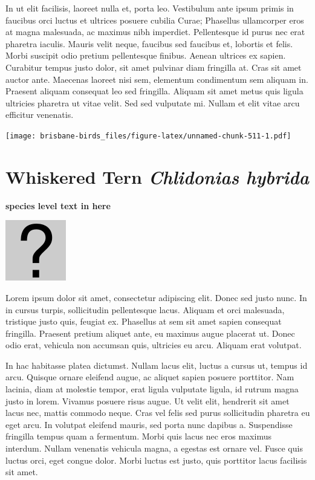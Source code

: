 \documentclass[]{book}
\let\origfigure\figure
\let\endorigfigure\endfigure
\renewenvironment{figure}[1][2] {
  \expandafter\origfigure\expandafter[H]
} {
  \endorigfigure
}
\begin{document}
In ut elit facilisis, laoreet nulla et, porta leo. Vestibulum ante ipsum
primis in faucibus orci luctus et ultrices posuere cubilia Curae;
Phasellus ullamcorper eros at magna malesuada, ac maximus nibh
imperdiet. Pellentesque id purus nec erat pharetra iaculis. Mauris velit
neque, faucibus sed faucibus et, lobortis et felis. Morbi suscipit odio
pretium pellentesque finibus. Aenean ultrices ex sapien. Curabitur
tempus justo dolor, sit amet pulvinar diam fringilla at. Cras sit amet
auctor ante. Maecenas laoreet nisi sem, elementum condimentum sem
aliquam in. Praesent aliquam consequat leo sed fringilla. Aliquam sit
amet metus quis ligula ultricies pharetra ut vitae velit. Sed sed
vulputate mi. Nullam et elit vitae arcu efficitur venenatis.

\begin{figure}
\centering
\texttt{[image: brisbane-birds\_files/figure-latex/unnamed-chunk-511-1.pdf]}
\caption{\label{fig:unnamed-chunk-511}insert figure caption}
\end{figure}

\section{\texorpdfstring{Whiskered Tern \emph{Chlidonias
hybrida}}{Whiskered Tern Chlidonias hybrida}}\label{whiskered-tern-chlidonias-hybrida}

\textbf{species level text in here}

\begin{figure}
\centering
\includegraphics{assets/missing.png}
\caption{No image for species}
\end{figure}

Lorem ipsum dolor sit amet, consectetur adipiscing elit. Donec sed justo
nunc. In in cursus turpis, sollicitudin pellentesque lacus. Aliquam et
orci malesuada, tristique justo quis, feugiat ex. Phasellus at sem sit
amet sapien consequat fringilla. Praesent pretium aliquet ante, eu
maximus augue placerat ut. Donec odio erat, vehicula non accumsan quis,
ultricies eu arcu. Aliquam erat volutpat.

In hac habitasse platea dictumst. Nullam lacus elit, luctus a cursus ut,
tempus id arcu. Quisque ornare eleifend augue, ac aliquet sapien posuere
porttitor. Nam lacinia, diam at molestie tempor, erat ligula vulputate
ligula, id rutrum magna justo in lorem. Vivamus posuere risus augue. Ut
velit elit, hendrerit sit amet lacus nec, mattis commodo neque. Cras vel
felis sed purus sollicitudin pharetra eu eget arcu. In volutpat eleifend
mauris, sed porta nunc dapibus a. Suspendisse fringilla tempus quam a
fermentum. Morbi quis lacus nec eros maximus interdum. Nullam venenatis
vehicula magna, a egestas est ornare vel. Fusce quis luctus orci, eget
congue dolor. Morbi luctus est justo, quis porttitor lacus facilisis sit
amet.
\end{document}
